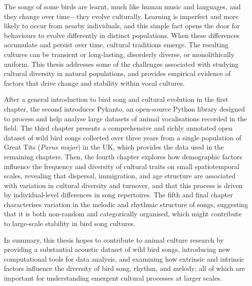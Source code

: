 The songs of some birds are learnt, much like human music and languages, and they change over time---they evolve culturally. Learning is imperfect and more likely to occur from nearby individuals, and this simple fact opens the door for behaviours to evolve differently in distinct populations. When these differences accumulate and persist over time, cultural traditions emerge. The resulting cultures can be transient or long-lasting, disorderly diverse, or monolithically uniform. This thesis addresses some of the challenges associated with studying cultural diversity in natural populations, and provides empirical evidence of factors that drive change and stability within vocal cultures. 

After a general introduction to bird song and cultural evolution in the first chapter, the second introduces Pykanto, an open-source Python library designed to process and help analyse large datasets of animal vocalisations recorded in the field. The third chapter presents a comprehensive and richly annotated open dataset of wild bird songs collected over three years from a single population of Great Tits (\textit{Parus major}) in the UK, which provides the data used in the remaining chapters. Then, the fourth chapter explores how demographic factors influence the frequency and diversity of cultural traits on small spatiotemporal scales, revealing that dispersal, immigration, and age structure are associated with variation in cultural diversity and turnover, and that this process is driven by individual-level differences in song repertoires. The fifth and final chapter characterises variation in the melodic and rhythmic structure of songs, suggesting that it is both non-random and categorically organised, which might contribute to large-scale stability in bird song cultures.

In summary, this thesis hopes to contribute to animal culture research by providing a substantial acoustic dataset of wild bird songs, introducing new computational tools for data analysis, and examining how extrinsic and intrinsic factors influence the diversity of bird song, rhythm, and melody; all of which are important for understanding emergent cultural processes at larger scales.
